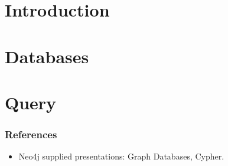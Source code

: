 \section[Intro]{Introduction}



\section[Db]{Databases}

\section[Query]{Query}


\begin{frame}\frametitle{References}
\begin{itemize}
\item Neo4j supplied presentations: Graph Databases, Cypher.
\end{itemize}
\end{frame}